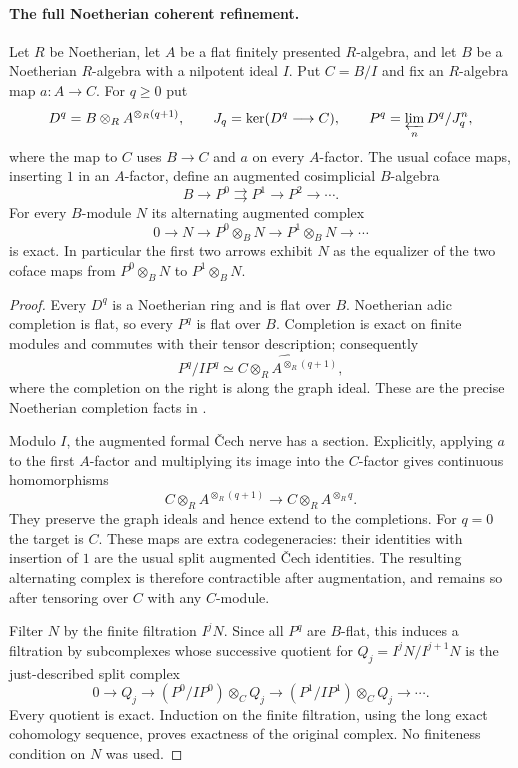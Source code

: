 \paragraph{The full Noetherian coherent refinement.}

\begin{lemma}\label{lem:DE-E2-completed-Cech}
Let $R$ be Noetherian, let $A$ be a flat finitely presented $R$-algebra, and let $B$ be a Noetherian $R$-algebra with a nilpotent ideal $I$.  Put $C=B/I$ and fix an $R$-algebra map $a:A\to C$.  For $q\geq0$ put
\[
 D^q=B\otimes_R A^{\otimes_R(q+1)},\qquad
 J_q=\ker(D^q\longrightarrow C),\qquad
 P^q=\varprojlim_n D^q/J_q^n,
\]
where the map to $C$ uses $B\to C$ and $a$ on every $A$-factor.  The usual coface maps, inserting $1$ in an $A$-factor, define an augmented cosimplicial $B$-algebra
\[
                    B\longrightarrow P^0\rightrightarrows P^1
                              \longrightarrow P^2\longrightarrow\cdots.
\]
For every $B$-module $N$ its alternating augmented complex
\[
 0\longrightarrow N\longrightarrow P^0\otimes_BN
       \longrightarrow P^1\otimes_BN\longrightarrow\cdots
\]
is exact.  In particular the first two arrows exhibit $N$ as the equalizer of the two coface maps from $P^0\otimes_BN$ to $P^1\otimes_BN$.
\end{lemma}
\begin{proof}
Every $D^q$ is a Noetherian ring and is flat over $B$.  Noetherian adic completion is flat, so every $P^q$ is flat over $B$.  Completion is exact on finite modules and commutes with their tensor description; consequently
\[
 P^q/IP^q\simeq
 \widehat{C\otimes_R A^{\otimes_R(q+1)}},
\]
where the completion on the right is along the graph ideal.  These are the precise Noetherian completion facts in \citet[Lemmas~10.97.1--6, especially Tags~00MA and~00MB]{StacksProject}.

Modulo $I$, the augmented formal \v{C}ech nerve has a section.  Explicitly, applying $a$ to the first $A$-factor and multiplying its image into the $C$-factor gives continuous homomorphisms
\[
 C\otimes_R A^{\otimes_R(q+1)}
       \longrightarrow C\otimes_R A^{\otimes_R q}.
\]
They preserve the graph ideals and hence extend to the completions.  For $q=0$ the target is $C$.  These maps are extra codegeneracies: their identities with insertion of $1$ are the usual split augmented \v{C}ech identities.  The resulting alternating complex is therefore contractible after augmentation, and remains so after tensoring over $C$ with any $C$-module.

Filter $N$ by the finite filtration $I^jN$.  Since all $P^q$ are $B$-flat, this induces a filtration by subcomplexes whose successive quotient for $Q_j=I^jN/I^{j+1}N$ is the just-described split complex
\[
 0\longrightarrow Q_j\longrightarrow
 (P^0/IP^0)\otimes_CQ_j\longrightarrow
 (P^1/IP^1)\otimes_CQ_j\longrightarrow\cdots.
\]
Every quotient is exact.  Induction on the finite filtration, using the long exact cohomology sequence, proves exactness of the original complex.  No finiteness condition on $N$ was used.
\end{proof}

